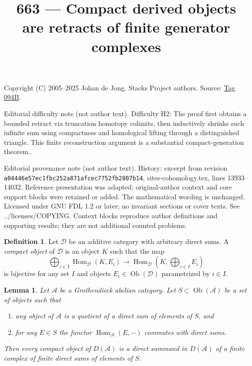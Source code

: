 \documentclass{amsart}
\theoremstyle{plain}
\newtheorem{lemma}[subsection]{Lemma}
\theoremstyle{definition}
\newtheorem{definition}[subsection]{Definition}
\theoremstyle{remark}
\numberwithin{equation}{subsection}
\def\Hom{\mathop{\mathrm{Hom}}\nolimits}
\def\Ob{\mathop{\mathrm{Ob}}\nolimits}
\begin{document}
\title[Stacks Project, Tag 094B]{663 --- Compact derived objects are retracts of finite generator complexes}
\maketitle
\noindent Copyright (C) 2005--2025 Johan de Jong. Stacks Project authors. Source: \href{https://stacks.math.columbia.edu/tag/094B}{Tag 094B}.

\noindent Editorial difficulty note (not author text). Difficulty H2: The proof first obtains a bounded retract via truncation homotopy colimits, then inductively shrinks each infinite sum using compactness and homological lifting through a distinguished triangle. This finite reconstruction argument is a substantial compact-generation theorem..

\noindent Editorial provenance note (not author text). History: excerpt from revision \texttt{a0444\allowbreak 6e57e\allowbreak c1fbc\allowbreak 252a8\allowbreak 71afc\allowbreak ec775\allowbreak 2fb28\allowbreak 07b14}, sites-cohomology.tex, lines 13933--14032. Reference presentation was adapted; original-author context and core support blocks were retained or added. The mathematical wording is unchanged. Licensed under GNU FDL 1.2 or later; no invariant sections or cover texts. See ../licenses/COPYING. Context blocks reproduce author definitions and supporting results; they are not additional counted problems.

\begin{definition}
\label{derived-definition-compact-object}
Let $\mathcal{D}$ be an additive category with arbitrary direct
sums. A {\it compact object} of $\mathcal{D}$ is an object $K$
such that the map
$$
\bigoplus\nolimits_{i \in I} \Hom_{\mathcal{D}}(K, E_i)
\longrightarrow
\Hom_{\mathcal{D}}(K, \bigoplus\nolimits_{i \in I} E_i)
$$
is bijective for any set $I$ and objects
$E_i \in \Ob(\mathcal{D})$ parametrized by $i \in I$.
\end{definition}

\begin{lemma}
\label{lemma-compact-in-terms-of-generators}
Let $\mathcal{A}$ be a Grothendieck abelian category. Let
$S \subset \Ob(\mathcal{A})$ be a set of objects such that
\begin{enumerate}
\item any object of $\mathcal{A}$ is a quotient of a direct sum
of elements of $S$, and
\item for any $E \in S$ the functor $\Hom_\mathcal{A}(E, -)$
commutes with direct sums.
\end{enumerate}
Then every compact object of $D(\mathcal{A})$ is a direct summand
in $D(\mathcal{A})$ of a finite complex of finite direct sums of
elements of $S$.
\end{lemma}
\end{document}
